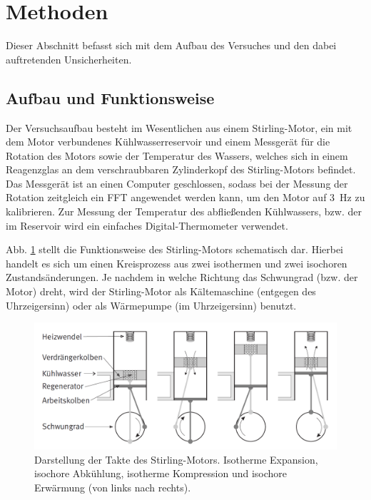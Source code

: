 \section{Methoden}
	
	Dieser Abschnitt befasst sich mit dem Aufbau des Versuches und den dabei auftretenden Unsicherheiten.
	
	\subsection{Aufbau und Funktionsweise}	
		
		Der Versuchsaufbau besteht im Wesentlichen aus einem Stirling-Motor, ein mit dem Motor verbundenes Kühlwasserreservoir und einem Messgerät für die Rotation des Motors sowie der Temperatur des Wassers, welches sich in einem Reagenzglas an dem verschraubbaren Zylinderkopf des Stirling-Motors befindet.
		Das Messgerät ist an einen Computer geschlossen, sodass bei der Messung der Rotation zeitgleich ein FFT angewendet werden kann, um den Motor auf \SI{3}{\hertz} zu kalibrieren.
		Zur Messung der Temperatur des abfließenden Kühlwassers, bzw. der im Reservoir wird ein einfaches Digital-Thermometer verwendet.
		
		Abb. \ref{fig:Aufbau} stellt die Funktionsweise des Stirling-Motors schematisch dar. 
		Hierbei handelt es sich um einen Kreisprozess aus zwei isothermen und zwei isochoren Zustandsänderungen.
		Je nachdem in welche Richtung das Schwungrad (bzw. der Motor) dreht, wird der Stirling-Motor als Kältemaschine (entgegen des Uhrzeigersinn) oder als Wärmepumpe (im Uhrzeigersinn) benutzt. 
		\begin{figure}[ht]
			\centering
			\includegraphics[width=\textwidth]{Aufbau.png}
			\caption{Darstellung der Takte des Stirling-Motors. Isotherme Expansion, isochore Abkühlung, isotherme Kompression und isochore Erwärmung (von links nach rechts).\cite{WWU}}
			\label{fig:Aufbau}	
		\end{figure}
				
